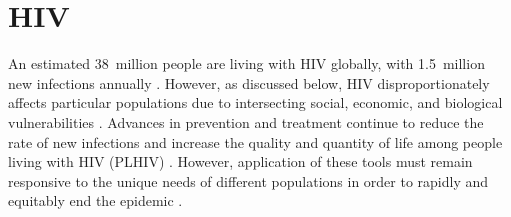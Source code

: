 \section{HIV}\label{intro.hiv}
An estimated 38~million people are living with HIV globally,
with 1.5~million new infections annually \cite{AIDSinfo}.
However, as discussed below, HIV disproportionately affects particular populations
due to intersecting social, economic, and biological vulnerabilities \cite{WHO2016kp,Jin2021}.
Advances in prevention and treatment continue to reduce the rate of new infections and
increase the quality and quantity of life among people living with HIV (PLHIV) \cite{Eisinger2019tk}.
However, application of these tools must remain responsive to
the unique needs of different populations
in order to rapidly and equitably end the epidemic \cite{Eisinger2019tk}.
\pagebreak %
